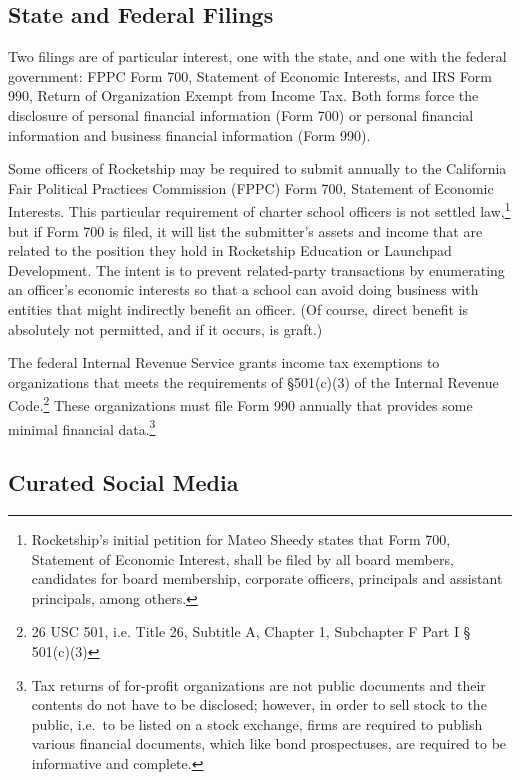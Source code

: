 \subsection{State and Federal Filings}\label{sec:state-federal-filings}\indent

Two filings are of particular interest, one with the state, and one with the federal government: FPPC Form 700, Statement of Economic Interests, and IRS Form 990, Return of Organization Exempt from Income Tax. Both forms force the disclosure of personal financial information (Form 700) or personal financial information and business financial information (Form 990). 

Some officers of Rocketship may be required to submit annually to the California Fair Political Practices Commission (FPPC) Form 700, Statement of Economic Interests. This particular requirement of charter school officers is not settled law,\footnote{Rocketship's initial petition for Mateo Sheedy states that Form 700, Statement of Economic Interest, shall be filed by all board members, candidates for board membership, corporate officers, principals and assistant principals, among others.} but if Form 700 is filed, it will list the submitter's assets and income that are related to the position they hold in Rocketship Education or Launchpad Development. The intent is to prevent related-party transactions by enumerating an officer's economic interests so that a school can avoid doing business with entities that might indirectly benefit an officer. (Of course, direct benefit is absolutely not permitted, and if it occurs, is graft.)  

The federal Internal Revenue Service grants income tax exemptions to organizations that meets the requirements of §501(c)(3) of the  Internal Revenue Code.\footnote{26 USC 501, i.e. Title 26, Subtitle A, Chapter 1, Subchapter F Part I § 501(c)(3)} These organizations must file Form 990 annually that provides some minimal financial data.\footnote{Tax returns of for-profit organizations are not public documents and their contents do not have to be disclosed; however, in order to sell stock to the public, i.e.~to be listed on a stock exchange, firms are required to publish various financial documents, which like bond prospectuses, are required to be informative and complete.} %

\subsection{Curated Social Media}\label{sec:curated-social-media}\indent

